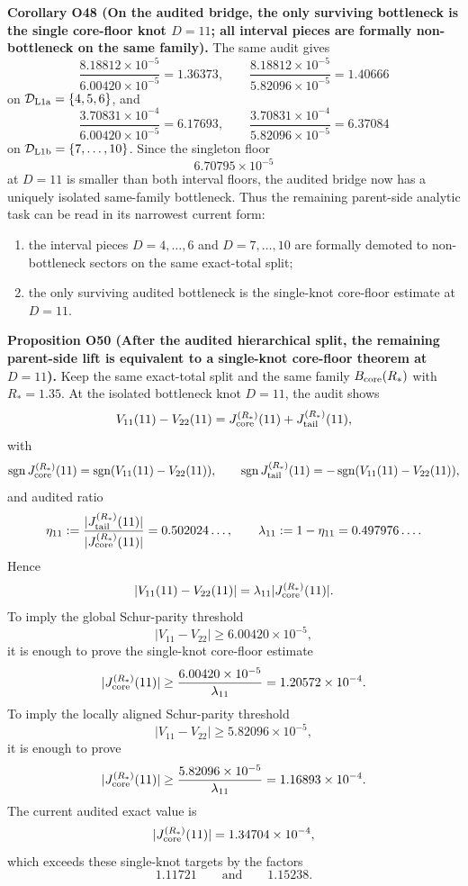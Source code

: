 \documentclass[aps,prd,onecolumn,notitlepage,nofootinbib,superscriptaddress,11pt,floatfix]{revtex4-2}
\begin{document}
\medskip\noindent\textbf{Corollary O48 (On the audited bridge, the only surviving bottleneck is the single core-floor knot \(D=11\); all interval pieces are formally non-bottleneck on the same family).}
The same audit gives
\[
\frac{8.18812\times10^{-5}}{6.00420\times10^{-5}}=1.36373,
\qquad
\frac{8.18812\times10^{-5}}{5.82096\times10^{-5}}=1.40666
\]
on \(\mathcal D_{\rm L1a}=\{4,5,6\}\), and
\[
\frac{3.70831\times10^{-4}}{6.00420\times10^{-5}}=6.17693,
\qquad
\frac{3.70831\times10^{-4}}{5.82096\times10^{-5}}=6.37084
\]
on \(\mathcal D_{\rm L1b}=\{7,\dots,10\}\).  Since the singleton floor
\[
6.70795\times10^{-5}
\]
at \(D=11\) is smaller than both interval floors, the audited bridge now has a uniquely isolated same-family bottleneck.  Thus the remaining parent-side analytic task can be read in its narrowest current form:
\begin{enumerate}
\item the interval pieces \(D=4,\dots,6\) and \(D=7,\dots,10\) are formally demoted to non-bottleneck sectors on the same exact-total split;
\item the only surviving audited bottleneck is the single-knot core-floor estimate at \(D=11\).
\end{enumerate}

\medskip\noindent\textbf{Proposition O50 (After the audited hierarchical split, the remaining parent-side lift is equivalent to a single-knot core-floor theorem at \(D=11\)).}
Keep the same exact-total split and the same family \(B_{\rm core}(R_\ast)\) with \(R_\ast=1.35\).  At the isolated bottleneck knot \(D=11\), the audit
shows
\[
V_{11}(11)-V_{22}(11)=J_{\rm core}^{(R_\ast)}(11)+J_{\rm tail}^{(R_\ast)}(11),
\]
with
\[
\operatorname{sgn}J_{\rm core}^{(R_\ast)}(11)=\operatorname{sgn}(V_{11}(11)-V_{22}(11)),
\qquad
\operatorname{sgn}J_{\rm tail}^{(R_\ast)}(11)=-\operatorname{sgn}(V_{11}(11)-V_{22}(11)),
\]
and audited ratio
\[
\eta_{11}:=
\frac{|J_{\rm tail}^{(R_\ast)}(11)|}{|J_{\rm core}^{(R_\ast)}(11)|}
=0.502024\ldots,
\qquad
\lambda_{11}:=1-\eta_{11}=0.497976\ldots.
\]
Hence
\[
|V_{11}(11)-V_{22}(11)|=\lambda_{11}|J_{\rm core}^{(R_\ast)}(11)|.
\]
To imply the global Schur-parity threshold
\[
|V_{11}-V_{22}|\ge 6.00420\times10^{-5},
\]
it is enough to prove the single-knot core-floor estimate
\[
|J_{\rm core}^{(R_\ast)}(11)|
\ge
\frac{6.00420\times10^{-5}}{\lambda_{11}}
=
1.20572\times10^{-4}.
\]
To imply the locally aligned Schur-parity threshold
\[
|V_{11}-V_{22}|\ge 5.82096\times10^{-5},
\]
it is enough to prove
\[
|J_{\rm core}^{(R_\ast)}(11)|
\ge
\frac{5.82096\times10^{-5}}{\lambda_{11}}
=
1.16893\times10^{-4}.
\]
The current audited exact value is
\[
|J_{\rm core}^{(R_\ast)}(11)|=1.34704\times10^{-4},
\]
which exceeds these single-knot targets by the factors
\[
1.11721
\qquad\text{and}\qquad
1.15238.
\]
\end{document}
